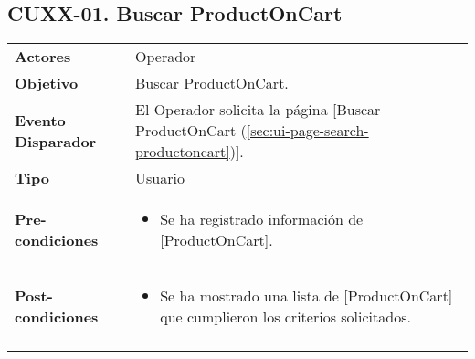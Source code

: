 	\subsection{CUXX-01. Buscar ProductOnCart} \label{sec:cu-search-ProductOnCart}
	
	\begin{tabular}{ p{3.5cm} p{11.5cm} }
		\textbf{Actores} & Operador\\
		\textbf{Objetivo} & Buscar ProductOnCart.\\
		\textbf{Evento Disparador} & El Operador solicita la p\'agina [Buscar ProductOnCart (\ref{sec:ui-page-search-productoncart})].\\
		\textbf{Tipo} & Usuario\\
		\textbf{Pre-condiciones} &
			\begin{minipage}[t]{0.6\textwidth}
			\begin{itemize}[noitemsep,nolistsep]
			\setlength{\itemindent}{-.5cm}
				\item Se ha registrado informaci\'on de [ProductOnCart].
			\end{itemize}
			\end{minipage} \\
		\textbf{Post-condiciones} &
			\begin{minipage}[t]{0.6\textwidth}
			\begin{itemize}[noitemsep,nolistsep]
			\setlength{\itemindent}{-.5cm}
				\item Se ha mostrado una lista de [ProductOnCart] que cumplieron los criterios solicitados.
			\end{itemize}
			\end{minipage} \\
		\\
	\end{tabular}
	

